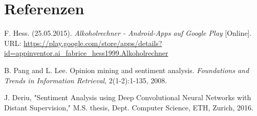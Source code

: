 \chapter{Referenzen}
\begin{thebibliography}{9}
  
  F. Hess. (25.05.2015). \emph{Alkoholrechner - Android-Apps auf Google Play} [Online]. URL: \url{https://play.google.com/store/apps/details?id=appinventor.ai_fabrice_hess1999.Alkoholrechner}

  B. Pang and L. Lee. Opinion mining and sentiment analysis. \emph{Foundations and Trends in Information Retrieval}, 2(1-2):1-135, 2008.
  
  J. Deriu, "Sentiment Analysis using Deep Convolutional Neural Networks with Distant Supervision," M.S. thesis, Dept. Computer Science, ETH, Zurich, 2016.

\end{thebibliography}